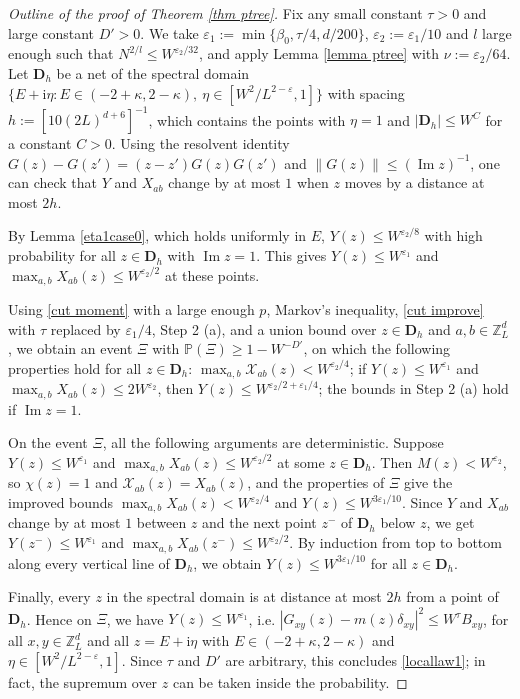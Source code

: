 \documentclass{article}
\newcommand{\1}{\mathds{1}}
\numberwithin{equation}{section}
\newcommand{\e}{{\varepsilon}}
\renewcommand{\cal}{\mathcal}
\newcommand{\ii}{\mathrm{i}} %
\renewcommand{\leq}{\leqslant}
\renewcommand{\geq}{\geqslant}
\renewcommand{\le}{\leq}
\renewcommand{\ge}{\geq}
\renewcommand{\P}{\mathbb{P}}
\newcommand{\Z}{\mathbb{Z}}
\DeclareMathOperator{\im}{Im}
\theoremstyle{plain} %
\theoremstyle{remark}
\begin{document}
\begin{proof}[Outline of the proof of Theorem \ref{thm ptree}]
Fix any small constant $\tau>0$ and large constant $D'>0$. We take $\e_1:=\min\{\beta_0,\tau/4,d/200\}$, $\e_2:=\e_1/10$ and $l$ large enough such that $N^{2/l}\le W^{\e_2/32}$, and apply Lemma \ref{lemma ptree} with $\nu:=\e_2/64$. Let $\mathbf D_h$ be a net of the spectral domain $\{E+\ii\eta: E\in (-2+\kappa,2-\kappa),\ \eta\in [W^{2}/L^{2-\e},1]\}$ with spacing $h:=[10(2L)^{d+6}]^{-1}$, which contains the points with $\eta=1$ and $|\mathbf D_h|\le W^C$ for a constant $C>0$. Using the resolvent identity $G(z)-G(z')=(z-z')G(z)G(z')$ and $\|G(z)\|\le (\im z)^{-1}$, one can check that $Y$ and $X_{ab}$ change by at most $1$ when $z$ moves by a distance at most $2h$.

\medskip
{} By Lemma \ref{eta1case0}, which holds uniformly in $E$, $Y(z)\le W^{\e_2/8}$ with high probability for all $z\in \mathbf D_h$ with $\im z=1$. This gives $Y(z)\le W^{\e_1}$ and $\max_{a,b}X_{ab}(z)\le W^{\e_2/2}$ at these points.

\medskip
{} Using \eqref{cut moment} with a large enough $p$, Markov's inequality, \eqref{cut improve} with $\tau$ replaced by $\e_1/4$, Step 2 (a), and a union bound over $z\in\mathbf D_h$ and $a,b\in \Z_L^d$, we obtain an event $\Xi$ with $\P(\Xi)\ge 1-W^{-D'}$, on which the following properties hold for all $z\in \mathbf D_h$: $\max_{a,b}\cal X_{ab}(z)< W^{\e_2/4}$; if $Y(z)\le W^{\e_1}$ and $\max_{a,b}X_{ab}(z)\le 2W^{\e_2}$, then $Y(z)\le W^{\e_2/2+\e_1/4}$; the bounds in Step 2 (a) hold if $\im z=1$.

\medskip
{} On the event $\Xi$, all the following arguments are deterministic. Suppose $Y(z)\le W^{\e_1}$ and $\max_{a,b}X_{ab}(z)\le W^{\e_2/2}$ at some $z\in \mathbf D_h$. Then $M(z)<W^{\e_2}$, so $\chi(z)=1$ and $\cal X_{ab}(z)=X_{ab}(z)$, and the properties of $\Xi$ give the improved bounds $\max_{a,b}X_{ab}(z)<W^{\e_2/4}$ and $Y(z)\le W^{3\e_1/10}$. Since $Y$ and $X_{ab}$ change by at most $1$ between $z$ and the next point $z^-$ of $\mathbf D_h$ below $z$, we get $Y(z^-)\le W^{\e_1}$ and $\max_{a,b}X_{ab}(z^-)\le W^{\e_2/2}$. By induction from top to bottom along every vertical line of $\mathbf D_h$, we obtain $Y(z)\le W^{3\e_1/10}$ for all $z\in \mathbf D_h$.

\medskip
{} Finally, every $z$ in the spectral domain is at distance at most $2h$ from a point of $\mathbf D_h$. Hence on $\Xi$, we have $Y(z)\le W^{\e_1}$, i.e. $|G_{xy}(z)-m(z)\delta_{xy}|^2\le W^{\tau}B_{xy}$, for all $x,y\in \Z_L^d$ and all $z=E+\ii\eta$ with $E\in (-2+\kappa,2-\kappa)$ and $\eta\in [W^{2}/L^{2-\e},1]$. Since $\tau$ and $D'$ are arbitrary, this concludes \eqref{locallaw1}; in fact, the supremum over $z$ can be taken inside the probability.
\end{proof}
\end{document}
